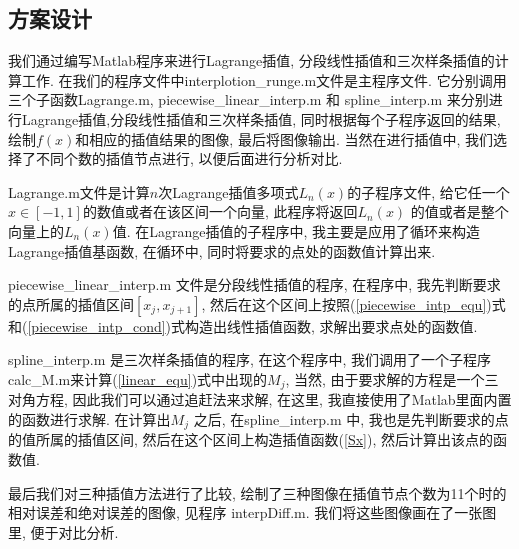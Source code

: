 \documentclass[a4paper]{article}
\begin{document}
\begin{spacing}{1.5}
\begin{CJK*}{GBK}{song}
\section{方案设计}
我们通过编写Matlab程序来进行Lagrange插值, 分段线性插值和三次样条插值的计算工作. 在我们的程序文件中interplotion\_runge.m文件是主程序文件. 它分别调用三个子函数Lagrange.m, piecewise\_linear\_interp.m 和 spline\_interp.m 来分别进行Lagrange插值,分段线性插值和三次样条插值, 同时根据每个子程序返回的结果, 绘制$f(x)$和相应的插值结果的图像, 最后将图像输出. 当然在进行插值中, 我们选择了不同个数的插值节点进行, 以便后面进行分析对比.\par
Lagrange.m文件是计算$n$次Lagrange插值多项式$L_n(x)$的子程序文件, 给它任一个$x\in[-1,1]$的数值或者在该区间一个向量, 此程序将返回$L_n(x)$ 的值或者是整个向量上的$L_n(x)$值. 在Lagrange插值的子程序中, 我主要是应用了循环来构造Lagrange插值基函数, 在循环中, 同时将要求的点处的函数值计算出来.\par
piecewise\_linear\_interp.m 文件是分段线性插值的程序, 在程序中, 我先判断要求的点所属的插值区间$[x_j, x_{j+1}]$, 然后在这个区间上按照(\ref{piecewise_intp_equ})式和(\ref{piecewise_intp_cond})式构造出线性插值函数, 求解出要求点处的函数值.\par

spline\_interp.m 是三次样条插值的程序, 在这个程序中, 我们调用了一个子程序calc\_M.m来计算(\ref{linear_equ})式中出现的$M_j$, 当然, 由于要求解的方程是一个三对角方程, 因此我们可以通过追赶法来求解, 在这里, 我直接使用了Matlab里面内置的函数进行求解. 在计算出$M_j$ 之后, 在spline\_interp.m 中, 我也是先判断要求的点的值所属的插值区间, 然后在这个区间上构造插值函数(\ref{Sx}), 然后计算出该点的函数值.\par

最后我们对三种插值方法进行了比较, 绘制了三种图像在插值节点个数为11个时的相对误差和绝对误差的图像, 见程序 interpDiff.m. 我们将这些图像画在了一张图里, 便于对比分析.


\end{CJK*}
\end{spacing}
\end{document}
